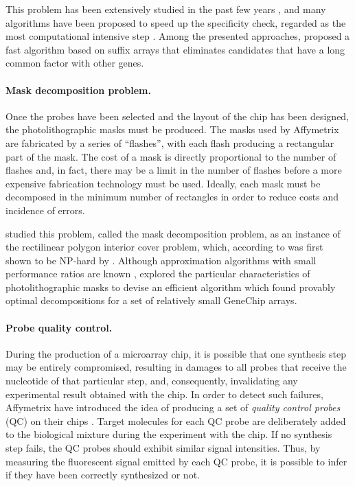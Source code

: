 This problem has been extensively studied in the past few years
\citep{Li2001,Kaderali2002}, and many algorithms have been proposed to speed up
the specificity check, regarded as the most computational intensive step
\citep{Rahmann2002,Sung2003,Chou2004}. Among the presented approaches,
\cite{Rahmann2002} proposed a fast algorithm based on suffix arrays
\citep{Manber1990} that eliminates candidates that have a long common factor
with other genes.

\paragraph{Mask decomposition problem.} Once the probes have been selected and
the layout of the chip has been designed, the photolithographic masks must be
produced. The masks used by Affymetrix are fabricated by a series of
``flashes'', with each flash producing a rectangular part of the mask. The cost
of a mask is directly proportional to the number of flashes
\citep{Hubbell1998,Hubbell1999} and, in fact, there may be a limit in the number
of flashes before a more expensive fabrication technology must be used. Ideally,
each mask must be decomposed in the minimum number of rectangles in order to
reduce costs and incidence of errors.

\citet{Hannenhalli2002} studied this problem, called the mask decomposition
problem, as an instance of the rectilinear polygon interior cover problem,
which, according to \citet{Garey1979} was first shown to be NP-hard by
\citet{Masek}. Although approximation algorithms with small performance ratios
are known \citep{Franzblau1986}, \citet{Hannenhalli2002} explored the particular
characteristics of photolithographic masks to devise an efficient algorithm
which found provably optimal decompositions for a set of relatively small
GeneChip arrays.

\paragraph{Probe quality control.} During the production of a microarray chip,
it is possible that one synthesis step may be entirely compromised, resulting in
damages to all probes that receive the nucleotide of that particular step, and,
consequently, invalidating any experimental result obtained with the chip. In
order to detect such failures, Affymetrix have introduced the idea of producing a
set of \emph{quality control probes} (QC) on their chips \citep{Affymetrix2002}.
Target molecules for each QC probe are deliberately added to the biological
mixture during the experiment with the chip. If no synthesis step fails, the QC
probes should exhibit similar signal intensities. Thus, by measuring the
fluorescent signal emitted by each QC probe, it is possible to infer if they
have been correctly synthesized or not.

